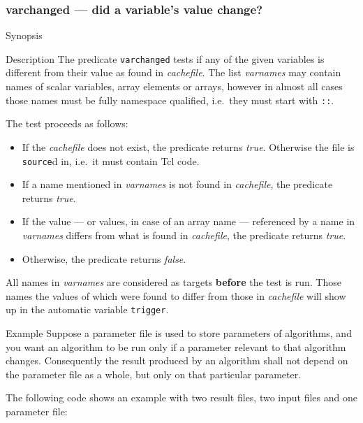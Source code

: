 \documentclass[11pt]{scrartcl}
\begin{document}
\subsubsection{varchanged --- did a variable's value change?}
\begin{Describe}
\item[Synopsis]   
\item[Description] The predicate \texttt{varchanged} tests if any of
  the given variables is different from their value as found in
  \textit{cachefile}. The list \textit{varnames} may contain names of
  scalar variables, array elements or arrays, however in almost all
  cases those names must be fully namespace qualified, i.e.\ they
  must start with \texttt{::}.

  The test proceeds as follows:
  \begin{itemize}
  \item If the \textit{cachefile} does not exist, the predicate
    returns \textit{true}. Otherwise the file is \texttt{source}d in,
    i.e.\ it must contain Tcl code.
  \item If a name mentioned in \textit{varnames} is not found in
    \textit{cachefile}, the predicate returns \textit{true}.
  \item If the value --- or values, in case of an array name ---
    referenced by a name in \textit{varnames} differs from what is
    found in \textit{cachefile}, the predicate returns \textit{true}.
  \item Otherwise, the predicate returns \textit{false}.
  \end{itemize}
  
  All names in \textit{varnames} are considered as targets
  \textbf{before} the test is run. Those names the values of which
  were found to differ from those in \textit{cachefile} will show up
  in the automatic variable \texttt{trigger}.

\item[Example]
  Suppose a parameter file is used to store parameters of
  algorithms, and you want an algorithm to be run only if a parameter
  relevant to that algorithm changes. Consequently the result produced by 
  an algorithm shall not depend on the parameter file as a whole, but
  only on that particular parameter.

  The following code shows an example with two result files, two input 
  files and one parameter file:
  \begingroup\small
  
  \endgroup


\end{Describe}
\end{document}
